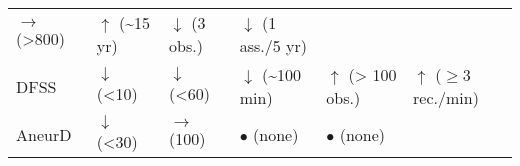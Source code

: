 \documentclass[
]{book}
\begin{document}
\begin{longtable}[]{@{}llllll@{}}
\begin{minipage}[t]{0.14\columnwidth}
\(\rightarrow\) (\textgreater800)\strut
\end{minipage} & \begin{minipage}[t]{0.14\columnwidth}\raggedright
\(\uparrow\) (\textasciitilde15 yr)\strut
\end{minipage} & \begin{minipage}[t]{0.14\columnwidth}\raggedright
\(\downarrow\) (3 obs.)\strut
\end{minipage} & \begin{minipage}[t]{0.14\columnwidth}\raggedright
\(\downarrow\) (1 ass./5 yr)\strut
\end{minipage}\tabularnewline
\begin{minipage}[t]{0.14\columnwidth}\raggedright
DFSS\strut
\end{minipage} & \begin{minipage}[t]{0.14\columnwidth}\raggedright
\(\downarrow\) (\textless10)\strut
\end{minipage} & \begin{minipage}[t]{0.14\columnwidth}\raggedright
\(\downarrow\) (\textless60)\strut
\end{minipage} & \begin{minipage}[t]{0.14\columnwidth}\raggedright
\(\downarrow\) (\textasciitilde100 min)\strut
\end{minipage} & \begin{minipage}[t]{0.14\columnwidth}\raggedright
\(\uparrow\) (\textgreater{} 100 obs.)\strut
\end{minipage} & \begin{minipage}[t]{0.14\columnwidth}\raggedright
\(\uparrow\) (\(\geq 3\) rec./min)\strut
\end{minipage}\tabularnewline
\begin{minipage}[t]{0.14\columnwidth}\raggedright
AneurD\strut
\end{minipage} & \begin{minipage}[t]{0.14\columnwidth}\raggedright
\(\downarrow\) (\textless30)\strut
\end{minipage} & \begin{minipage}[t]{0.14\columnwidth}\raggedright
\(\rightarrow\) (100)\strut
\end{minipage} & \begin{minipage}[t]{0.14\columnwidth}\raggedright
\(\bullet\) (none)\strut
\end{minipage} & \begin{minipage}[t]{0.14\columnwidth}\raggedright
\(\bullet\) (none)\strut
\end{minipage} & \begin{minipage}[t]{0.14\columnwidth}\raggedright

\end{minipage}
\end{longtable}
\end{document}
